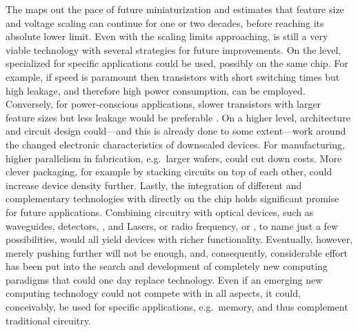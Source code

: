 The  \cite{itrs2011} maps out the pace of future 
miniaturization and estimates that feature size and voltage scaling can continue
for one or two decades, before reaching its absolute lower limit. Even with the
scaling limits approaching,  is still a very viable technology with
several strategies for future improvements. On the  level,
specialized  for specific applications could be used, possibly on
the same chip. For example, if speed is paramount then transistors with short
switching times but high leakage, and therefore high power consumption, can be
employed. Conversely, for power-conscious applications, slower transistors with
larger feature sizes but less leakage would be preferable
\cite{cavin2012science}. On a higher level, architecture and circuit design
could---and this is already done to some extent---work around the changed
electronic characteristics of downscaled devices. For manufacturing, higher
parallelism in fabrication, e.g.~larger wafers, could cut down costs. More
clever packaging, for example by stacking circuits on top of each other, could
increase device density further. Lastly, the integration of different and
complementary technologies with  directly on the chip holds
significant promise for future applications. Combining  circuitry
with optical devices, such as waveguides, detectors, , and Lasers,
or radio frequency, or , to name just a few possibilities, would all
yield devices with richer functionality. Eventually, however, merely pushing
 further will not be enough, and, consequently, considerable effort
has been put into the search and development of completely new computing
paradigms that could one day replace  technology. Even if an emerging
new computing technology could not compete with  in all aspects, it
could, conceivably, be used for specific applications, e.g.~memory, and thus
complement traditional circuitry.


